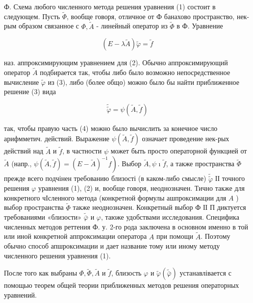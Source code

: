 \documentclass[10pt]{article}
\begin{document}
Ф. Схема любого численного метода решения уравнения (1) состоит в следующем. Пусть $\tilde{\Phi}$, вообще говоря, отличное от Ф банахово пространство, нек-рым образом связанное с $\Phi, \tilde{A}$ - линейный оператор из $\tilde{\Phi}$ в Ф. Уравнение



\[

(E-\lambda \tilde{A}) \tilde{\varphi}=\tilde{f}

\]



наз. аппроксимирующим уравнением для (2). Обычно аппроксимирующий оператор $\tilde{A}$ подбирается так, чтобы либо было возможно непосредственное вычисление $\tilde{\varphi}$ из (3), либо (более общо) можно было бы найти приближенное решение (3) вида



\[

\tilde{\tilde{\varphi}}=\psi(\tilde{A}, \tilde{f})

\]



так, чтобы правую часть (4) можно было вычислить за конечное число арифмметич. действий. Выражение $\psi(\tilde{A}, \tilde{f})$ означает проведение нек-рых действий над $\tilde{A}$ и $\tilde{f}$, в частности $\psi$ может быть просто операторной функцией от $\tilde{A}$ (напр., $\left.\psi(\tilde{A}, \tilde{f})=(E-\tilde{A})^{-1} f\right)$. Выбор $\tilde{A}, \psi$ ı $\tilde{f}$, а также пространства $\tilde{\Phi}$ прежде всего подчінен требованию близості (в каком-либо смысле) $\tilde{\tilde{\varphi}}$ ІІ точного решения $\varphi$ уравнения (1), (2) и, вообще говоря, неоднозначен. Тично также для конкретного чІсленного метода (конкретной формулы ашпроксимации для $A$ ) выбор пространства $\tilde{\Phi}$ также неоднозначен. Конкретный выбор Ф ІІ П диктуется требованиями «близости» $\tilde{\bar{\varphi}}$ и $\varphi$, таюже удобствами исследования. Специфика численных методов реттения Ф. у. 2-го рода заключена в основном именно в той или иной конкретной аппроксимации оператора $A$ при помощи $\tilde{A}$. Поэтому обычно способ апшроксимации и дает название тому или иному методу численного решения уравнения (1).



После того как выбраны $\Phi, \tilde{\Phi}, \tilde{A}$ и $\tilde{f}$, близость $\varphi$ и $\tilde{\varphi}(\tilde{\bar{\varphi}})$ устанавлівается с помощью теорем общей теории приближенных методов решения операторных уравнений.
\end{document}

